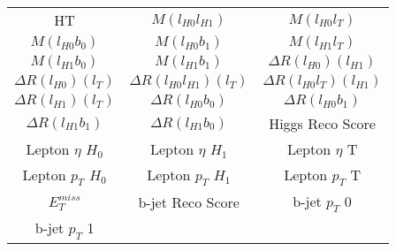   \begin{center}
  \begin{tabular}{ccc}
    \hline\hline
    HT & $M(l_{H0}l_{H1})$ & $M(l_{H0}l_{T})$ \\
    $M(l_{H0}b_0)$ & $M(l_{H0}b_1)$ & $M(l_{H1}l_{T})$ \\
    $M(l_{H1}b_0)$ & $M(l_{H1}b_1)$ & $\Delta R(l_{H0})(l_{H1})$ \\
    $\Delta R(l_{H0})(l_{T})$ & $\Delta R(l_{H0}l_{H1})(l_{T})$ & $\Delta R(l_{H0}l_{T})(l_{H1})$ \\
    $\Delta R(l_{H1})(l_{T})$ & $\Delta R(l_{H0}b_0)$ & $\Delta R(l_{H0}b_1)$ \\
    $\Delta R(l_{H1}b_1)$ & $\Delta R(l_{H1}b_0)$ & Higgs Reco Score \\
    Lepton  $\eta$ $H_0$ & Lepton  $\eta$ $H_1$ & Lepton  $\eta$ T \\
    Lepton  $p_T$ $H_0$ & Lepton  $p_T$ $H_1$ & Lepton  $p_T$ T \\
    $E_T^{miss}$ & b-jet Reco Score & b-jet $p_T$ 0 \\
    b-jet $p_T$ 1 & & \\
    \hline
  \end{tabular}
  \end{center}

